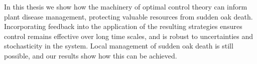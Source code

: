 In this thesis we show how the machinery of optimal control theory can inform plant disease management, protecting valuable resources from sudden oak death. Incorporating feedback into the application of the resulting strategies ensures control remains effective over long time scales, and is robust to uncertainties and stochasticity in the system. Local management of sudden oak death is still possible, and our results show how this can be achieved.